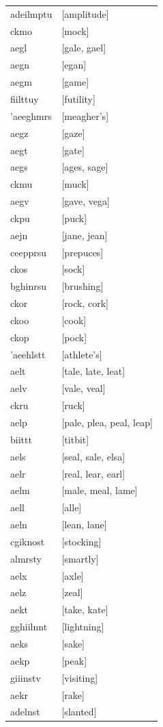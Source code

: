 \documentclass{article}
\begin{document}
\begin{tabular}{ll}
adeilmptu & [amplitude] \\
ckmo & [mock] \\
aegl & [gale, gael] \\
aegn & [egan] \\
aegm & [game] \\
fiilttuy & [futility] \\
'aeeghmrs & [meagher's] \\
aegz & [gaze] \\
aegt & [gate] \\
aegs & [ages, sage] \\
ckmu & [muck] \\
aegv & [gave, vega] \\
ckpu & [puck] \\
aejn & [jane, jean] \\
ceepprsu & [prepuces] \\
ckos & [sock] \\
bghinrsu & [brushing] \\
ckor & [rock, cork] \\
ckoo & [cook] \\
ckop & [pock] \\
'aeehlstt & [athlete's] \\
aelt & [tale, late, leat] \\
aelv & [vale, veal] \\
ckru & [ruck] \\
aelp & [pale, plea, peal, leap] \\
biittt & [titbit] \\
aels & [seal, sale, elsa] \\
aelr & [real, lear, earl] \\
aelm & [male, meal, lame] \\
aell & [alle] \\
aeln & [lean, lane] \\
cgiknost & [stocking] \\
almrsty & [smartly] \\
aelx & [axle] \\
aelz & [zeal] \\
aekt & [take, kate] \\
gghiilnnt & [lightning] \\
aeks & [sake] \\
aekp & [peak] \\
giiinstv & [visiting] \\
aekr & [rake] \\
adelnst & [slanted] \\

\end{tabular}
\end{document}
